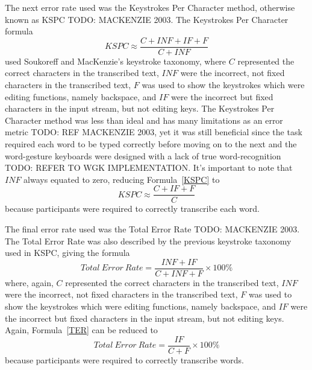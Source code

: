 The next error rate used was the Keystrokes Per Character method, otherwise known as KSPC TODO: MACKENZIE 2003. The Keystrokes Per Character formula
\begin{equation} \label{KSPC}
KSPC \approx \frac{C + INF + IF + F}{C + INF}
\end{equation}
used Soukoreff and MacKenzie's keystroke taxonomy, where $C$ represented the correct characters in the transcribed text, $INF$ were the incorrect, not fixed characters in the transcribed text, $F$ was used to show the keystrokes which were editing functions, namely backspace, and $IF$ were the incorrect but fixed characters in the input stream, but not editing keys. The Keystrokes Per Character method was less than ideal and has many limitations as an error metric TODO: REF MACKENZIE 2003, yet it was still beneficial since the task required each word to be typed correctly before moving on to the next and the word-gesture keyboards were designed with a lack of true word-recognition TODO: REFER TO WGK IMPLEMENTATION. It's important to note that $INF$ always equated to zero, reducing Formula~\ref{KSPC} to
\begin{equation} \label{KSPC_simple}
KSPC \approx \frac{C + IF + F}{C}
\end{equation}
because participants were required to correctly transcribe each word.

The final error rate used was the Total Error Rate TODO: MACKENZIE 2003. The Total Error Rate was also described by the previous keystroke taxonomy used in KSPC, giving the formula
\begin{equation} \label{TER}{
Total\ Error\ Rate = \frac{INF + IF}{C + INF + F} \times 100\%
}
\end{equation}
where, again, $C$ represented the correct characters in the transcribed text, $INF$ were the incorrect, not fixed characters in the transcribed text, $F$ was used to show the keystrokes which were editing functions, namely backspace, and $IF$ were the incorrect but fixed characters in the input stream, but not editing keys. Again, Formula~\ref{TER} can be reduced to
\begin{equation} \label{TER_simple}
Total\ Error\ Rate = \frac{IF}{C + F} \times 100\%
\end{equation}
because participants were required to correctly transcribe words.

